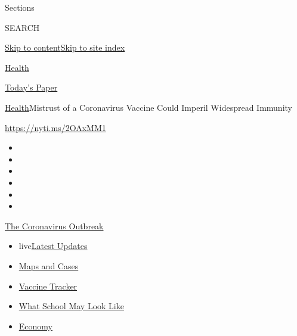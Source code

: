 Sections

SEARCH

\protect\hyperlink{site-content}{Skip to
content}\protect\hyperlink{site-index}{Skip to site index}

\href{https://www.nytimes3xbfgragh.onion/section/health}{Health}

\href{https://myaccount.nytimes3xbfgragh.onion/auth/login?response_type=cookie\&client_id=vi}{}

\href{https://www.nytimes3xbfgragh.onion/section/todayspaper}{Today's
Paper}

\href{/section/health}{Health}\textbar{}Mistrust of a Coronavirus
Vaccine Could Imperil Widespread Immunity

\url{https://nyti.ms/2OAxMM1}

\begin{itemize}
\item
\item
\item
\item
\item
\item
\end{itemize}

\href{https://www.nytimes3xbfgragh.onion/news-event/coronavirus?action=click\&pgtype=Article\&state=default\&region=TOP_BANNER\&context=storylines_menu}{The
Coronavirus Outbreak}

\begin{itemize}
\tightlist
\item
  live\href{https://www.nytimes3xbfgragh.onion/2020/08/02/world/coronavirus-updates.html?action=click\&pgtype=Article\&state=default\&region=TOP_BANNER\&context=storylines_menu}{Latest
  Updates}
\item
  \href{https://www.nytimes3xbfgragh.onion/interactive/2020/us/coronavirus-us-cases.html?action=click\&pgtype=Article\&state=default\&region=TOP_BANNER\&context=storylines_menu}{Maps
  and Cases}
\item
  \href{https://www.nytimes3xbfgragh.onion/interactive/2020/science/coronavirus-vaccine-tracker.html?action=click\&pgtype=Article\&state=default\&region=TOP_BANNER\&context=storylines_menu}{Vaccine
  Tracker}
\item
  \href{https://www.nytimes3xbfgragh.onion/interactive/2020/07/29/us/schools-reopening-coronavirus.html?action=click\&pgtype=Article\&state=default\&region=TOP_BANNER\&context=storylines_menu}{What
  School May Look Like}
\item
  \href{https://www.nytimes3xbfgragh.onion/live/2020/07/31/business/stock-market-today-coronavirus?action=click\&pgtype=Article\&state=default\&region=TOP_BANNER\&context=storylines_menu}{Economy}
\end{itemize}

